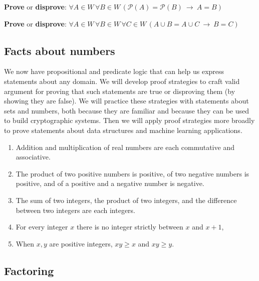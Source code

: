 \documentclass[12pt, oneside]{article}
\begin{document}
\vfill
\vfill
\vfill

{\bf Prove} or {\bf  disprove}:  $\forall  A \in W\,  \forall B \in W\,  \left( \mathcal{P}(A)  =\mathcal{P}(B)
~\to ~ A = B \right)$

\vfill
\vfill

{\bf Prove} or {\bf  disprove}:  $\forall  A \in W\,  \forall B \in W\, \forall C  \in W\,  \left( A\cup B  = A \cup  C
~\to ~ B = C \right)$

\vfill
\vfill 
\subsection*{Facts about numbers}


We now have propositional and predicate logic that can help us express 
statements about any domain. We will develop proof strategies to 
craft valid argument for proving that such statements are true or disproving
them (by showing they are false). We will practice these strategies with 
statements about sets and numbers, both because they are familiar and because they
can be used to build cryptographic systems. Then we will apply proof strategies
more broadly to prove statements about data structures and machine learning 
applications. 

\begin{enumerate}
    \item Addition and multiplication of real 
    numbers are each commutative and associative. 
    \vspace{25pt}
    \item The product of two positive numbers is positive, of 
    two negative numbers is positive, and of a positive and a negative number is negative.
    \vspace{25pt}
    \item The sum of two integers, the product of two integers, and the 
    difference between two integers are each integers.
    \vspace{25pt}
    \item For every integer $x$ there is no integer strictly between $x$ and $x+1$, 
    \vspace{25pt}
    \item When $x, y$ are positive integers, $xy \geq x$ and $xy \geq y$.
    \vspace{25pt}
\end{enumerate}
 \newpage
\subsection*{Factoring}
\end{document}

